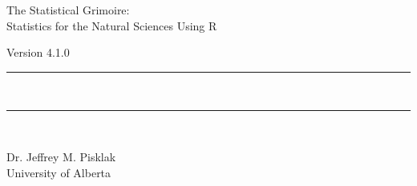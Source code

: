{}
{
\Huge\centering\headingfont The Statistical Grimoire: \\
Statistics for the Natural Sciences Using R\\

\vspace{0.5em}

\small\mdseries\raggedright Version 4.1.0

\rule{\linewidth}{1pt}\\[-6mm]
\rule{\linewidth}{2pt}\\

}

\vskip 2cm

\begin{center}
\Large Dr. Jeffrey M. Pisklak \\
\vspace{0.5em}
\large University of Alberta
\end{center}

\vfill

